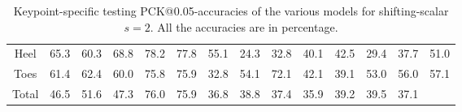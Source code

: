 \documentclass[./main.tex]{subfiles}
\begin{document}
\begin{table}[htbp]
\begin{adjustbox}{center}
\begin{tabular}{c||ccc|ccc|ccc|ccc|c}
            Heel & 65.3 & 60.3 & 68.8 & 78.2 & 77.8 & 55.1 & 24.3 & 32.8 & 40.1 & 42.5 & 29.4 & 37.7 & 51.0 \\
            Toes & 61.4 & 62.4 & 60.0 & 75.8 & 75.9 & 32.8 & 54.1 & 72.1 & 42.1 & 39.1 & 53.0 & 56.0 & 57.1 \\
            \hline
            Total & 46.5 & 51.6 & 47.3 & 76.0 & 75.9 & 36.8 & 38.8 & 37.4 & 35.9 & 39.2 & 39.5 & 37.1 & \\
            \hline
        \end{tabular}
    \end{adjustbox}
    \caption{Keypoint-specific testing PCK@0.05-accuracies of the various models for shifting-scalar $s = 2$. All the accuracies are in percentage.}
    \label{tab:finetune_kpts_test_accs_05_2}
\end{table}
\end{document}
